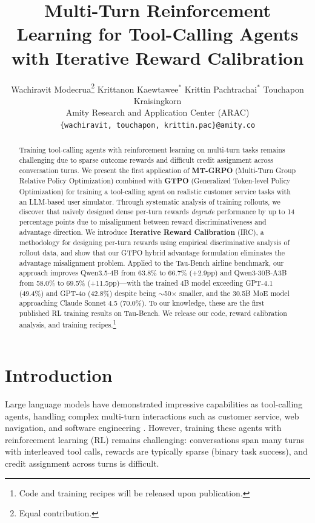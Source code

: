 \documentclass[11pt]{article}
\title{Multi-Turn Reinforcement Learning for Tool-Calling Agents \\ with Iterative Reward Calibration}
\author{
  Wachiravit Modecrua\thanks{\;Equal contribution.} \quad
  Krittanon Kaewtawee$^*$ \quad
  Krittin Pachtrachai$^*$ \quad
  Touchapon Kraisingkorn \\
  Amity Research and Application Center (ARAC) \\
  \texttt{\{wachiravit, touchapon, krittin.pac\}@amity.co}
}
\newcommand{\irc}{\textsc{IRC}}
\begin{document}
\maketitle

\begin{abstract}
Training tool-calling agents with reinforcement learning on multi-turn tasks remains challenging due to sparse outcome rewards and difficult credit assignment across conversation turns. We present the first application of \textbf{MT-GRPO} (Multi-Turn Group Relative Policy Optimization) combined with \textbf{GTPO} (Generalized Token-level Policy Optimization) for training a tool-calling agent on realistic customer service tasks with an LLM-based user simulator. Through systematic analysis of training rollouts, we discover that na\"ively designed dense per-turn rewards \emph{degrade} performance by up to 14 percentage points due to misalignment between reward discriminativeness and advantage direction. We introduce \textbf{Iterative Reward Calibration} (\irc{}), a methodology for designing per-turn rewards using empirical discriminative analysis of rollout data, and show that our GTPO hybrid advantage formulation eliminates the advantage misalignment problem. Applied to the Tau-Bench airline benchmark, our approach improves Qwen3.5-4B from 63.8\% to 66.7\% (+2.9pp) and Qwen3-30B-A3B from 58.0\% to 69.5\% (+11.5pp)---with the trained 4B model exceeding GPT-4.1 (49.4\%) and GPT-4o (42.8\%) despite being $\sim$50$\times$ smaller, and the 30.5B MoE model approaching Claude Sonnet 4.5 (70.0\%). To our knowledge, these are the first published RL training results on Tau-Bench. We release our code, reward calibration analysis, and training recipes.\footnote{Code and training recipes will be released upon publication.}
\end{abstract}

\section{Introduction}
\label{sec:intro}

Large language models have demonstrated impressive capabilities as tool-calling agents, handling complex multi-turn interactions such as customer service, web navigation, and software engineering \cite{yao2023react,schick2023toolformer}. However, training these agents with reinforcement learning (RL) remains challenging: conversations span many turns with interleaved tool calls, rewards are typically sparse (binary task success), and credit assignment across turns is difficult.
\end{document}
